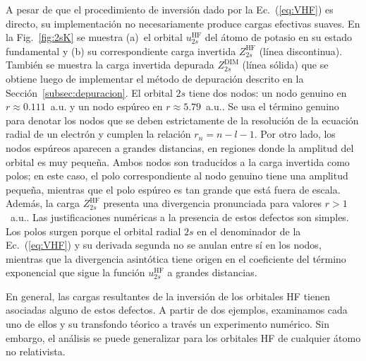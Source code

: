 A pesar de que el procedimiento de inversión dado por la 
Ec.~(\ref{eq:VHF}) es directo, su implementación no necesariamente 
produce cargas efectivas suaves. En la Fig.~\ref{fig:2sK} se muestra 
(a)~el orbital $u_{2s}^{\mathrm{HF}}$ del átomo de potasio en su estado 
fundamental y (b) su correspondiente carga invertida 
$Z_{2s}^{\mathrm{HF}}$ (línea discontinua). También se muestra la carga
invertida depurada $Z_{2s}^{\mathrm{DIM}}$ (línea sólida) que se obtiene 
luego de implementar el método de depuración descrito en la 
Sección~\ref{subsec:depuracion}. 
El orbital $2s$ tiene dos nodos: un nodo genuino en 
$r\approx 0.111$~a.u. y un nodo espúreo en $r\approx 5.79$~a.u.. Se usa 
el término genuino para denotar los nodos que se deben estrictamente de 
la resolución de la ecuación radial de un electrón y cumplen la relación 
$r_n=n-l-1$. Por otro lado, los nodos espúreos aparecen a grandes 
distancias, en regiones donde la amplitud del orbital es muy pequeña. 
Ambos nodos son traducidos a la carga invertida como polos; en este 
caso, el polo correspondiente al nodo genuino tiene una amplitud pequeña, 
mientras que el polo espúreo es tan grande que está fuera de escala. 
Además, la carga $Z_{2s}^{\mathrm{HF}}$ presenta una divergencia 
pronunciada para valores $r>1$~a.u.. Las justificaciones numéricas a la 
presencia de estos defectos son simples. Los polos surgen porque el 
orbital radial $2s$ en el denominador de la Ec.~(\ref{eq:VHF}) y su 
derivada segunda no se anulan entre sí en los nodos, mientras que la 
divergencia asintótica tiene origen en el coeficiente del término 
exponencial que sigue la función $u_{2s}^{\mathrm{HF}}$ a grandes 
distancias.



En general, las cargas resultantes de la inversión de los orbitales HF 
tienen asociadas alguno de estos defectos. A partir de dos ejemplos, 
examinamos cada uno de ellos y su transfondo téorico a través un 
experimento numérico. Sin embargo, el análisis se puede generalizar 
para los orbitales HF de cualquier átomo no relativista.

